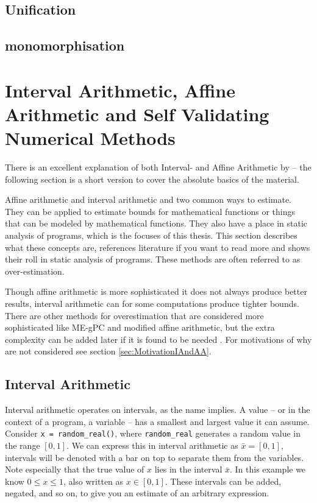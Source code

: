 \subsection{Unification}

\subsection{monomorphisation}

\section{Interval Arithmetic, Affine Arithmetic and Self Validating Numerical Methods}
\label{sec:IAndAA}

There is an excellent explanation of both Interval- and Affine Arithmetic by \citeauthor{src:affAri} -- the following section is a short version to cover the absolute basics of the material.

Affine arithmetic and interval arithmetic and two common ways to estimate. They can be applied to estimate bounds for mathematical functions or things that can be modeled by mathematical functions. They also have a place in static analysis of programs, which is the focuses of this thesis. This section describes what these concepts are, references literature if you want to read more and shows their roll in static analysis of programs. These methods are often referred to as over-estimation.

Though affine arithmetic is more sophisticated it does not always produce better results, interval arithmetic can for some computations produce tighter bounds. There are other methods for overestimation that are considered more sophisticated like ME-gPC and modified affine arithmetic, but the extra complexity can be added later if it is found to be needed \cite{src:MEgPC}. For motivations of why are not considered see section \ref{sec:MotivationIAndAA}.

\subsection{Interval Arithmetic}
Interval arithmetic operates on intervals, as the name implies. A value -- or in the context of a program, a variable -- has a smallest and largest value it can assume. Consider \verb`x = random_real()`, where \verb`random_real` generates a random value in the range $[0, 1]$. We can express this in interval arithmetic as $\bar{x} = [0, 1]$, intervals will be denoted with a bar on top to separate them from the variables. Note especially that the true value of $x$ lies in the interval $\bar{x}$. In this example we know $0 \leq x \leq 1$, also written as $x \in [0, 1]$. These intervals can be added, negated, and so on, to give you an estimate of an arbitrary expression.

